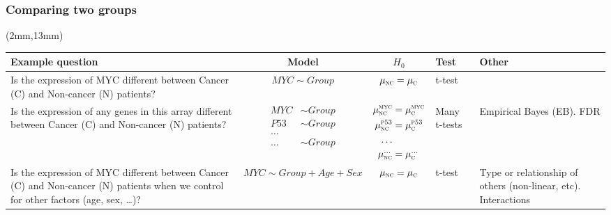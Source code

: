 \begin{frame}
\frametitle{Comparing two groups}

\TPMargin{7pt}
\begin{textblock*}{153mm}(2mm,13mm)
\renewcommand{\arraystretch}{1.5}
\begin{tabular}{>{\centering}m{2.92cm} c c p{1.0cm} m{1.92cm}}

\hline
\hline
Example question & Model & $H_0$ & Test & Other \\
\hline
\hline

Is the expression of MYC different between Cancer (C) and Non-cancer (N)
patients? & $MYC \sim Group$ & $\mu_{\textsc{nc}} = \mu_{\textsc{c}}$ & t-test& \\
\hline
Is the expression of any genes in this array different between Cancer (C)
and Non-cancer (N) patients? & $\begin{aligned} MYC & \sim Group\\
  P53 & \sim Group\\
\ldots &\\
\ldots & \sim Group
\end{aligned}$
&
$\begin{aligned} \mu_{\textsc{nc}}^{\textsc{myc}} & = \mu_{\textsc{c}}^{\textsc{myc}}\\
\mu_{\textsc{nc}}^{\textsc{p53}} & = \mu_{\textsc{c}}^{\textsc{p53}}\\
\ldots & \\
\mu_{\textsc{nc}}^{\ldots} & = \mu_{\textsc{c}}^{\ldots}
\end{aligned}$
&Many t-tests & Empirical Bayes (EB). FDR\\
\hline


Is the expression of MYC different between Cancer (C) and Non-cancer (N)
patients when we control for other factors (age, sex, \ldots)? & $MYC \sim
Group + Age + Sex$ & $\mu_{\textsc{nc}} = \mu_{\textsc{c}}$ & t-test &
{\tiny Type or relationship of others (non-linear, etc). Interactions}\\
\hline


\end{tabular}
\end{textblock*}
\end{frame}
